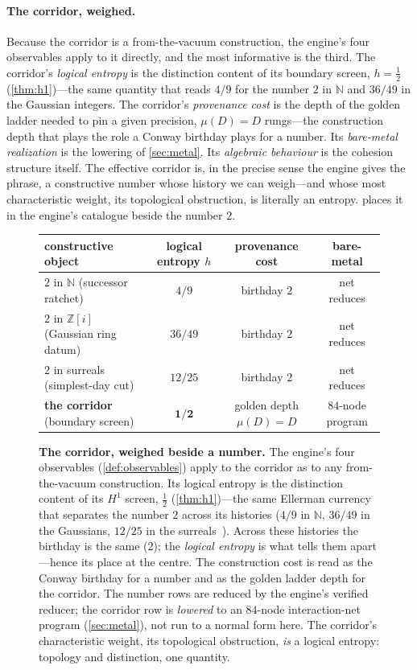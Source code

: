 \documentclass[11pt,letterpaper]{article}
\theoremstyle{plain}
\theoremstyle{definition}
\theoremstyle{remark}
\newcommand{\NN}{\mathbb{N}}
\newcommand{\ZZ}{\mathbb{Z}}
\newcommand{\modulus}{\mu}
\newcommand{\Llog}{h}                                   %
\begin{document}
\paragraph{The corridor, weighed.}
Because the corridor is a from-the-vacuum construction, the engine's four observables
apply to it directly, and the most informative is the third. The corridor's
\emph{logical entropy} is the distinction content of its boundary screen,
$\Llog=\tfrac12$ (\cref{thm:h1})---the same quantity that reads $4/9$ for the
number $2$ in $\NN$ and $36/49$ in the Gaussian integers. The corridor's
\emph{provenance cost} is the depth of the golden ladder needed to pin a given
precision, $\modulus(D)=D$ rungs---the construction depth that plays the role a
Conway birthday plays for a number. Its \emph{bare-metal realization} is the
lowering of \cref{sec:metal}. Its \emph{algebraic behaviour} is the cohesion structure
itself. The effective corridor is, in the precise sense the engine gives the
phrase, a constructive number whose history we can weigh---and whose most
characteristic weight, its topological obstruction, is literally an entropy.
 places it in the engine's catalogue beside the number $2$.

\begin{figure}[t]
\centering
\renewcommand{\arraystretch}{1.3}
\footnotesize
\begin{tabular}{@{}>{\raggedright\arraybackslash}p{4.3cm} c c c@{}}
\toprule
\textbf{constructive object} & \textbf{logical entropy } $\Llog$
  & \textbf{provenance cost} & \textbf{bare-metal} \\
\midrule
$2$ in $\NN$ (successor ratchet)        & $4/9$   & birthday $2$ & net reduces \\
$2$ in $\ZZ[i]$ (Gaussian ring datum)   & $36/49$ & birthday $2$ & net reduces \\
$2$ in surreals (simplest-day cut)      & $12/25$ & birthday $2$ & net reduces \\
\textbf{the corridor} (boundary screen) & $\bm{1/2}$ & golden depth $\modulus(D){=}D$ & $84$-node program \\
\bottomrule
\end{tabular}
\caption{\textbf{The corridor, weighed beside a number.} The engine's four
observables (\cref{def:observables}) apply to the corridor as to any from-the-vacuum
construction. Its logical entropy is the distinction content of its $H^1$ screen,
$\tfrac12$ (\cref{thm:h1})---the same Ellerman currency that separates the number
$2$ across its histories ($4/9$ in $\NN$, $36/49$ in the Gaussians, $12/25$ in the
surreals~\citep{iaom_every_number}). Across these histories the birthday is the
same ($2$); the \emph{logical entropy} is what tells them apart---hence its place
at the centre. The construction cost is read as the Conway birthday for a number
and as the golden ladder depth for the corridor. The number rows are reduced by the
engine's verified reducer; the corridor row is \emph{lowered} to an $84$-node
interaction-net program (\cref{sec:metal}), not run to a normal form here. The
corridor's characteristic weight, its topological obstruction, \emph{is} a logical
entropy: topology and distinction, one quantity.}
\label{fig:measure}
\end{figure}
\end{document}
